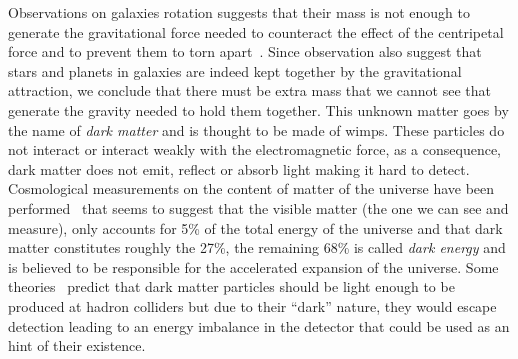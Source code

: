 Observations on galaxies rotation suggests that their mass is not enough to
generate the gravitational force needed to counteract the effect of the
centripetal force and to prevent them to torn apart~\cite{RotationCurves}. Since
observation also suggest that stars and planets in galaxies are indeed kept
together by the gravitational attraction, we conclude that there must be extra
mass that we cannot see that generate the gravity needed to hold them
together. This unknown matter goes by the name of \emph{dark matter} and is
thought to be made of \glspl{wimp}. These particles do not interact or interact
weakly with the electromagnetic force, as a consequence, dark matter does not
emit, reflect or absorb light making it hard to detect. Cosmological
measurements on the content of matter of the universe have been
performed~\cite{DMEvidence} that seems to suggest that the visible matter (the
one we can see and measure), only accounts for 5\% of the total energy of the
universe and that dark matter constitutes roughly the 27\%, the remaining 68\%
is called \emph{dark energy} and is believed to be responsible for the
accelerated expansion of the universe. Some theories~\cite{WIMPIntro} predict
that dark matter particles should be light enough to be produced at hadron
colliders but due to their ``dark'' nature, they would escape detection leading
to an energy imbalance in the detector that could be used as an hint of their
existence.
